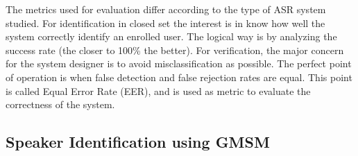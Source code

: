 The metrics used for evaluation differ according to the type of ASR system studied. For identification in closed set the interest is in know how well the system correctly identify an enrolled user. The logical way is by analyzing the success rate (the closer to 100\% the better). For verification, the major concern for the system designer is to avoid misclassification as possible. The perfect point of operation is when false detection and false rejection rates are equal. This point is called Equal Error Rate (EER), and is used as metric to evaluate the correctness of the system.

\subsection{Speaker Identification using GMSM}

%
%
%







